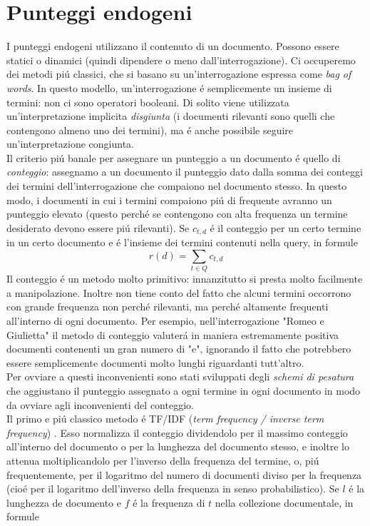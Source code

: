 \section{Punteggi endogeni}
I punteggi endogeni utilizzano il contenuto di un documento. Possono essere statici o dinamici (quindi dipendere o meno dall'interrogazione). Ci occuperemo dei metodi piú classici, che si basano su un'interrogazione espressa come \textit{bag of words}. In questo modello, un'interrogazione é semplicemente un insieme di termini: non ci sono operatori booleani. Di solito viene utilizzata un'interpretazione implicita \textit{disgiunta} (i documenti rilevanti sono quelli che contengono almeno uno dei termini), ma é anche possibile seguire un'interpretazione congiunta.\\
Il criterio piú banale per assegnare un punteggio a un documento é quello di \textit{conteggio}: assegnamo a un documento il punteggio dato dalla somma dei conteggi dei termini dell'interrogazione che compaiono nel documento stesso. In questo modo, i documenti in cui i termini compaiono piú di frequente avranno un punteggio elevato (questo perché se contengono con alta frequenza un termine desiderato devono essere piú rilevanti). Se $c_{t, d}$ é il conteggio per un certo termine in un certo documento e  é l'insieme dei termini contenuti nella query, in formule
\begin{equation*}
    r(d) = \sum_{t \in Q}{c_{t, d}}
\end{equation*}
Il conteggio é un metodo molto primitivo: innanzitutto si presta molto facilmente a manipolazione. Inoltre non tiene conto del fatto che alcuni termini occorrono con grande frequenza non perché rilevanti, ma perché altamente frequenti all'interno di ogni documento. Per esempio, nell'interrogazione "Romeo e Giulietta" il metodo di conteggio valuterá in maniera estremamente positiva documenti contenenti un gran numero di "e", ignorando il fatto che potrebbero essere semplicemente documenti molto lunghi riguardanti tutt'altro.\\
Per ovviare a questi inconvenienti sono stati sviluppati degli \textit{schemi di pesatura} che aggiustano il punteggio assegnato a ogni termine in ogni documento in modo da ovviare agli inconvenienti del conteggio.\\
Il primo e piú classico metodo é TF/IDF (\textit{term frequency / inverse term frequency}) \cite{tfidf}. Esso normalizza il conteggio dividendolo per il massimo conteggio all'interno del documento o per la lunghezza del documento stesso, e inoltre lo attenua moltiplicandolo per l'inverso della frequenza del termine, o, piú frequentemente, per il logaritmo del numero di documenti diviso per la frequenza (cioé per il logaritmo dell'inverso della frequenza in senso probabilistico). Se $l$ é la lunghezza de documento e $f$ é la frequenza di $t$ nella collezione documentale, in formule
